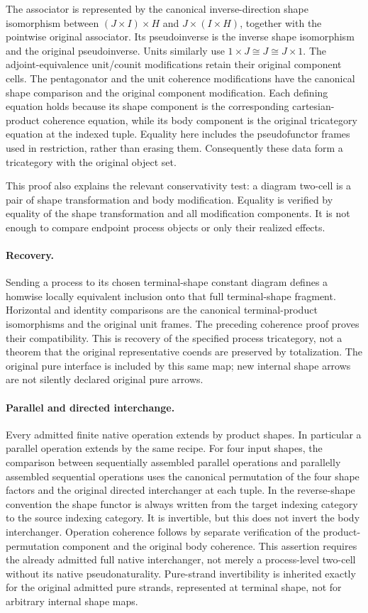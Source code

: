 \documentclass{article}
\begin{document}
The associator is represented by the canonical inverse-direction shape isomorphism between $(J\times I)\times H$ and $J\times(I\times H)$, together with the pointwise original associator. Its pseudoinverse is the inverse shape isomorphism and the original pseudoinverse. Units similarly use $1\times J\cong J\cong J\times1$. The adjoint-equivalence unit/counit modifications retain their original component cells. The pentagonator and the unit coherence modifications have the canonical shape comparison and the original component modification. Each defining equation holds because its shape component is the corresponding cartesian-product coherence equation, while its body component is the original tricategory equation at the indexed tuple. Equality here includes the pseudofunctor frames used in restriction, rather than erasing them. Consequently these data form a tricategory with the original object set.

This proof also explains the relevant conservativity test: a diagram two-cell is a pair of shape transformation and body modification. Equality is verified by equality of the shape transformation and all modification components. It is not enough to compare endpoint process objects or only their realized effects.

\paragraph{Recovery.} Sending a process to its chosen terminal-shape constant diagram defines a homwise locally equivalent inclusion onto that full terminal-shape fragment. Horizontal and identity comparisons are the canonical terminal-product isomorphisms and the original unit frames. The preceding coherence proof proves their compatibility. This is recovery of the specified process tricategory, not a theorem that the original representative coends are preserved by totalization. The original pure interface is included by this same map; new internal shape arrows are not silently declared original pure arrows.

\paragraph{Parallel and directed interchange.} Every admitted finite native operation extends by product shapes. In particular a parallel operation extends by the same recipe. For four input shapes, the comparison between sequentially assembled parallel operations and parallelly assembled sequential operations uses the canonical permutation of the four shape factors and the original directed interchanger at each tuple. In the reverse-shape convention the shape functor is always written from the target indexing category to the source indexing category. It is invertible, but this does not invert the body interchanger. Operation coherence follows by separate verification of the product-permutation component and the original body coherence. This assertion requires the already admitted full native interchanger, not merely a process-level two-cell without its native pseudonaturality. Pure-strand invertibility is inherited exactly for the original admitted pure strands, represented at terminal shape, not for arbitrary internal shape maps.
\end{document}

